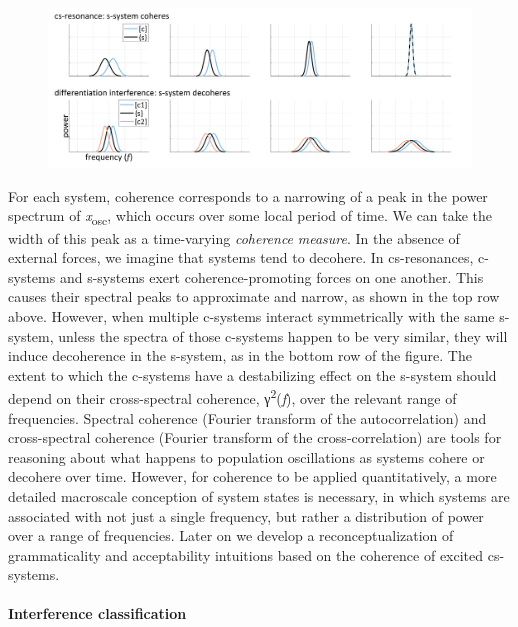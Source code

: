   
\begin{figure}
\includegraphics[width=\textwidth]{figures/Tilsen-img93.png}
\caption{\missingcaption}
\label{fig:}
\end{figure}
 

  For each system, coherence corresponds to a narrowing of a peak in the power spectrum of \textit{x}\textsubscript{osc}, which occurs over some local period of time. We can take the width of this peak as a time-varying \textit{coherence} \textit{measure}. In the absence of external forces, we imagine that systems tend to decohere. In cs-resonances, c-systems and s-systems exert coherence-promoting forces on one another. This causes their spectral peaks to approximate and narrow, as shown in the top row above. However, when multiple c-systems interact symmetrically with the same s-system, unless the spectra of those c-systems happen to be very similar, they will induce decoherence in the s-system, as in the bottom row of the figure. The extent to which the c-systems have a destabilizing effect on the s-system should depend on their cross-spectral coherence, γ\textsuperscript{2}(\textit{f}), over the relevant range of frequencies. Spectral coherence (Fourier transform of the autocorrelation) and cross-spectral coherence (Fourier transform of the cross-correlation) are tools for reasoning about what happens to population oscillations as systems cohere or decohere over time. However, for coherence to be applied quantitatively, a more detailed macroscale conception of system states is necessary, in which systems are associated with not just a single frequency, but rather a distribution of power over a range of frequencies. Later on we develop a reconceptualization of grammaticality and acceptability intuitions based on the coherence of excited cs-systems.

\paragraph{Interference classification}

